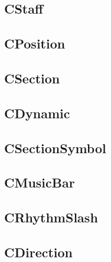 \documentclass[a4paper]{article}
\begin{document}
\subsection{CStaff}
\subsection{CPosition}
\subsection{CSection}
\subsection{CDynamic}
\subsection{CSectionSymbol}
\subsection{CMusicBar}
\subsection{CRhythmSlash}
\subsection{CDirection}
\end{document}
